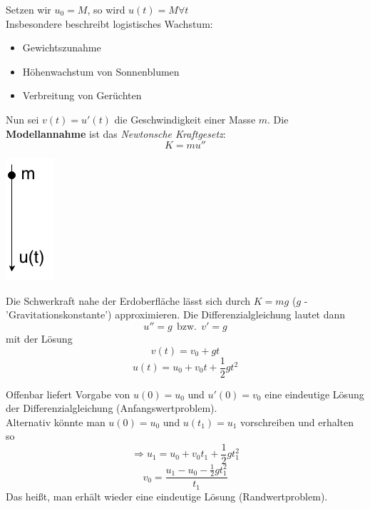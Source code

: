 \begin{beispiel}
Setzen wir $u_0 = M$, so wird $u(t) = M \forall t $ \\

Insbesondere beschreibt logistisches Wachstum:
\begin{itemize}
    \item Gewichtszunahme
    \item Höhenwachstum von Sonnenblumen
    \item Verbreitung von Gerüchten
\end{itemize}

\end{beispiel}
\newpage
\begin{beispiel}

Nun sei $v(t) = u'(t) $ die Geschwindigkeit einer Masse $m$. Die 
\textbf{Modellannahme} ist das \emph{Newtonsche Kraftgesetz}: 
\begin{equation*}
K = m u'' 
\end{equation*}
\begin{center}
\includegraphics[scale=0.5]{pictures/011-03.png}                        
\end{center}
Die Schwerkraft nahe der Erdoberfläche lässt sich durch $K = mg$ ($g$ - 'Gravitationskonstante') approximieren. Die 
Differenzialgleichung lautet dann
\begin{equation*}
u'' = g \ \ \mathrm{bzw.\ \ }v' = g
\end{equation*}
mit der Lösung
\begin{equation*}
v(t) = v_0 + gt
\end{equation*}
\begin{equation*}
u(t) = u_0 + v_0 t + \frac{1}{2} g t^2
\end{equation*}

Offenbar liefert Vorgabe von $u(0) = u_0 $ und $u'(0) = v_0 $ eine eindeutige Lösung
der Differenzialgleichung (Anfangswertproblem).\\
Alternativ könnte man $u(0) = u_0 $ und $u(t_1) = u_1 $ vorschreiben und erhalten so
\begin{equation*}
\Rightarrow u_1 = u_0 + v_0 t_1 + \frac{1}{2} g t_1^2
\end{equation*}
\begin{equation*}
v_0 = \frac{u_1 - u_0 - \frac{1}{2} g t_1^2}{t_1}
\end{equation*}
Das heißt, man erhält wieder eine eindeutige Lösung (Randwertproblem).
\end{beispiel}
